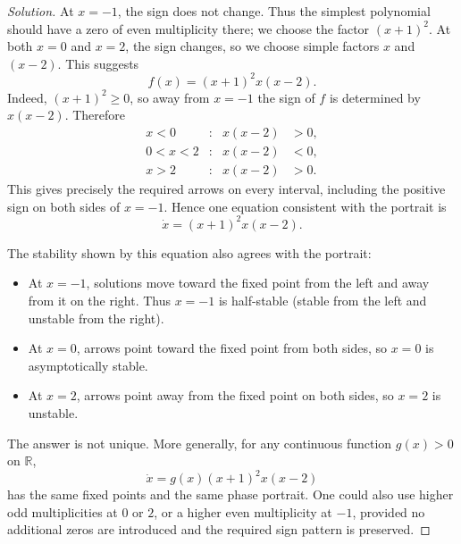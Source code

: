 \documentclass[10pt]{amsart}
\newenvironment{solution}
{\begin{proof}[Solution]}
{\end{proof}}
\begin{document}
\begin{onehalfspace}
\begin{solution}
            At $x=-1$, the sign does not change. Thus the simplest polynomial should
            have a zero of even multiplicity there; we choose the factor $(x+1)^2$.
            At both $x=0$ and $x=2$, the sign changes, so we choose simple factors $x$
            and $(x-2)$. This suggests
            \[
                f(x)=(x+1)^2x(x-2).
            \]
            Indeed, $(x+1)^2\geq0$, so away from $x=-1$ the sign of $f$ is determined
            by $x(x-2)$. Therefore
            \[
                \begin{aligned}
                    x<0 &: &x(x-2)&>0,\\
                    0<x<2 &: &x(x-2)&<0,\\
                    x>2 &: &x(x-2)&>0.
                \end{aligned}
            \]
            This gives precisely the required arrows on every interval, including the
            positive sign on both sides of $x=-1$. Hence one equation consistent with
            the portrait is
            \[
                \boxed{\dot{x}=(x+1)^2x(x-2).}
            \]

            The stability shown by this equation also agrees with the portrait:
            \begin{itemize}
                \item At $x=-1$, solutions move toward the fixed point from the left and
                away from it on the right. Thus $x=-1$ is half-stable
                (stable from the left and unstable from the right).
                \item At $x=0$, arrows point toward the fixed point from both sides, so
                $x=0$ is asymptotically stable.
                \item At $x=2$, arrows point away from the fixed point on both sides, so
                $x=2$ is unstable.
            \end{itemize}

            The answer is not unique. More generally, for any continuous function
            $g(x)>0$ on $\mathbb R$,
            \[
                \boxed{\dot{x}=g(x)(x+1)^2x(x-2)}
            \]
            has the same fixed points and the same phase portrait. One could also use
            higher odd multiplicities at $0$ or $2$, or a higher even multiplicity at
            $-1$, provided no additional zeros are introduced and the required sign
            pattern is preserved.
        \end{solution}


\end{onehalfspace}
\end{document}
